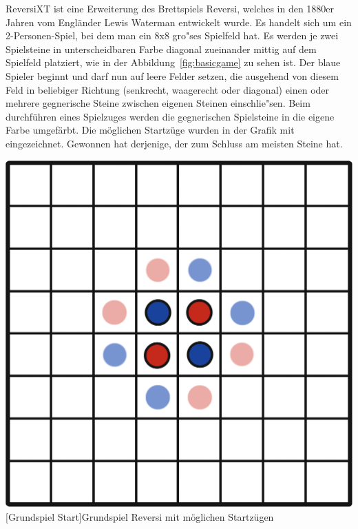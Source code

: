 ReversiXT ist eine Erweiterung des Brettspiels Reversi, welches in den 1880er Jahren vom Engl\"ander Lewis Waterman entwickelt wurde.
Es handelt sich um ein 2-Personen-Spiel, bei dem man ein 8x8 gro"ses Spielfeld hat.
Es werden je zwei Spielsteine in unterscheidbaren Farbe diagonal zueinander mittig auf dem Spielfeld platziert, wie in der Abbildung~\ref{fig:basicgame} zu sehen ist.
Der blaue Spieler beginnt und darf nun auf leere Felder setzen, die ausgehend von diesem Feld in beliebiger Richtung (senkrecht, waagerecht oder diagonal) einen oder mehrere gegnerische Steine zwischen eigenen Steinen einschlie"sen.
Beim durchf\"uhren eines Spielzuges werden die gegnerischen Spielsteine in die eigene Farbe umgef\"arbt.
Die m\"oglichen Startz\"uge wurden in der Grafik mit eingezeichnet.
Gewonnen hat derjenige, der zum Schluss am meisten Steine hat.

\vspace{1em}
\begin{minipage}{\linewidth}
	\centering
	\includegraphics[width=0.5\linewidth]{pics/basicgame-start}
	[Grundspiel Start]{Grundspiel Reversi mit möglichen Startzügen}
	\label{fig:basicgame}
\end{minipage}

